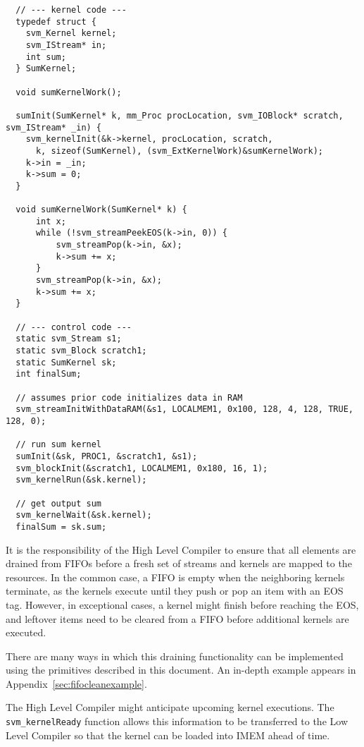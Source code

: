 {\small
\begin{verbatim}
  // --- kernel code ---
  typedef struct {
    svm_Kernel kernel;
    svm_IStream* in;
    int sum;
  } SumKernel;

  void sumKernelWork();
  
  sumInit(SumKernel* k, mm_Proc procLocation, svm_IOBlock* scratch, svm_IStream* _in) {
    svm_kernelInit(&k->kernel, procLocation, scratch,
      k, sizeof(SumKernel), (svm_ExtKernelWork)&sumKernelWork); 
    k->in = _in;
    k->sum = 0;
  }

  void sumKernelWork(SumKernel* k) {
      int x;
      while (!svm_streamPeekEOS(k->in, 0)) {
          svm_streamPop(k->in, &x);
          k->sum += x;
      }
      svm_streamPop(k->in, &x);
      k->sum += x;
  }

  // --- control code ---
  static svm_Stream s1;
  static svm_Block scratch1;
  static SumKernel sk;
  int finalSum;

  // assumes prior code initializes data in RAM
  svm_streamInitWithDataRAM(&s1, LOCALMEM1, 0x100, 128, 4, 128, TRUE, 128, 0);

  // run sum kernel
  sumInit(&sk, PROC1, &scratch1, &s1);
  svm_blockInit(&scratch1, LOCALMEM1, 0x180, 16, 1);
  svm_kernelRun(&sk.kernel);

  // get output sum
  svm_kernelWait(&sk.kernel);
  finalSum = sk.sum; 
\end{verbatim}}

\label{sec:fifoclean}

It is the responsibility of the High Level Compiler to ensure that all
elements are drained from FIFOs before a fresh set of streams and
kernels are mapped to the resources.  In the common case, a FIFO is
empty when the neighboring kernels terminate, as the kernels execute
until they push or pop an item with an EOS tag.  However, in
exceptional cases, a kernel might finish before reaching the EOS, and
leftover items need to be cleared from a FIFO before additional
kernels are executed.

There are many ways in which this draining functionality can be
implemented using the primitives described in this document.  An
in-depth example appears in Appendix~\ref{sec:fifocleanexample}.


The High Level Compiler might anticipate upcoming kernel
executions. The {\tt svm\_kernelReady} function allows this
information to be transferred to the Low Level Compiler so that the
kernel can be loaded into IMEM ahead of time.


